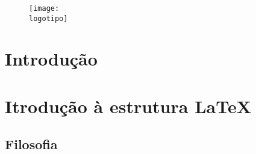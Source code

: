 \documentclass{report}
\begin{document}


\begin{titlepage}
\begin{center} 
\vspace*{50mm}{\Huge \titulo}\\ 
\vspace{15mm}{\LARGE \autores}\\ 
\vspace{30mm} \begin{figure}[h] \center \texttt{[image: \\logotipo]} \end{figure}
\vspace{30mm}
\end{center}
\begin{flushright} \versao \end{flushright} 
\end{titlepage}
\title{{\Huge\textbf{\titulo}}\\}\author{\autores \\ \autorescontactos}
\date{\data} \maketitle {}

\renewcommand{\abstractname}{Resumo}
\begin{abstract}

\end{abstract}


\tableofcontents 
\clearpage
{}

\chapter{Introdução}
\label{chap.introducao}


\chapter{Itrodução à estrutura \LaTeX}

\section{Filosofia}
\label{chap.filosofia}

\end{document}
